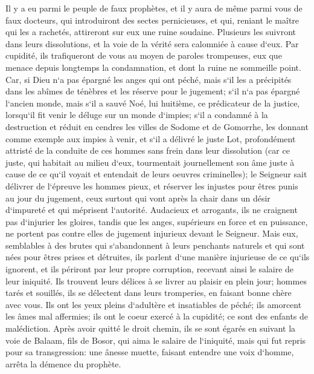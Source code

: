 \verse Il y a eu parmi le peuple de faux prophètes, et il y aura de même parmi vous de faux docteurs, qui introduiront des sectes pernicieuses, et qui, reniant le maître qui les a rachetés, attireront sur eux une ruine soudaine. 
\verse Plusieurs les suivront dans leurs dissolutions, et la voie de la vérité sera calomniée à cause d`eux. 
\verse Par cupidité, ils trafiqueront de vous au moyen de paroles trompeuses, eux que menace depuis longtemps la condamnation, et dont la ruine ne sommeille point. 
\verse Car, si Dieu n`a pas épargné les anges qui ont péché, mais s`il les a précipités dans les abîmes de ténèbres et les réserve pour le jugement; 
\verse s`il n`a pas épargné l`ancien monde, mais s`il a sauvé Noé, lui huitième, ce prédicateur de la justice, lorsqu`il fit venir le déluge sur un monde d`impies; 
\verse s`il a condamné à la destruction et réduit en cendres les villes de Sodome et de Gomorrhe, les donnant comme exemple aux impies à venir, 
\verse et s`il a délivré le juste Lot, profondément attristé de la conduite de ces hommes sans frein dans leur dissolution 
\verse (car ce juste, qui habitait au milieu d`eux, tourmentait journellement son âme juste à cause de ce qu`il voyait et entendait de leurs oeuvres criminelles); 
\verse le Seigneur sait délivrer de l`épreuve les hommes pieux, et réserver les injustes pour êtres punis au jour du jugement, 
\verse ceux surtout qui vont après la chair dans un désir d`impureté et qui méprisent l`autorité. Audacieux et arrogants, ils ne craignent pas d`injurier les gloires, 
\verse tandis que les anges, supérieurs en force et en puissance, ne portent pas contre elles de jugement injurieux devant le Seigneur. 
\verse Mais eux, semblables à des brutes qui s`abandonnent à leurs penchants naturels et qui sont nées pour êtres prises et détruites, ils parlent d`une manière injurieuse de ce qu`ils ignorent, et ils périront par leur propre corruption, 
\verse recevant ainsi le salaire de leur iniquité. Ils trouvent leurs délices à se livrer au plaisir en plein jour; hommes tarés et souillés, ils se délectent dans leurs tromperies, en faisant bonne chère avec vous. 
\verse Ils ont les yeux pleins d`adultère et insatiables de péché; ils amorcent les âmes mal affermies; ils ont le coeur exercé à la cupidité; ce sont des enfants de malédiction. 
\verse Après avoir quitté le droit chemin, ils se sont égarés en suivant la voie de Balaam, fils de Bosor, qui aima le salaire de l`iniquité, 
\verse mais qui fut repris pour sa transgression: une ânesse muette, faisant entendre une voix d`homme, arrêta la démence du prophète. 
